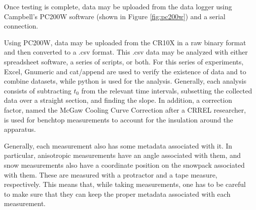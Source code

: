 Once testing is complete, data may be uploaded from the data logger using
Campbell's PC200W software (shown in Figure \ref{fig:pc200w}) and a serial connection.

Using PC200W, data may be uploaded from the CR10X in a raw binary format and then
converted to a .csv format. This .csv data may be analyzed with either spreadsheet software, a series of
scripts, or both. For this series of experiments, Excel, Gnumeric and cat/append are used
to verify the existence of data and to combine datasets, while python is used
for the analysis.  Generally, each analysis consists of subtracting \(t_0\)
from the relevant time intervals, subsetting the collected data over a straight
section, and finding the slope.  In addition, a correction factor, named the
McGaw Cooling Curve Correction after a CRREL researcher, is used for benchtop
measurements to account for the insulation around the apparatus.

Generally, each measurement also has some metadata associated with it. In
particular, anisotropic measurements have an angle associated with them, and
snow measurements also have a coordinate position on the snowpack associated
with them. These are measured with a protractor and a tape measure,
respectively. This means that, while taking measurements, one has to be careful
to make sure that they can keep the proper metadata associated with each
measurement.

